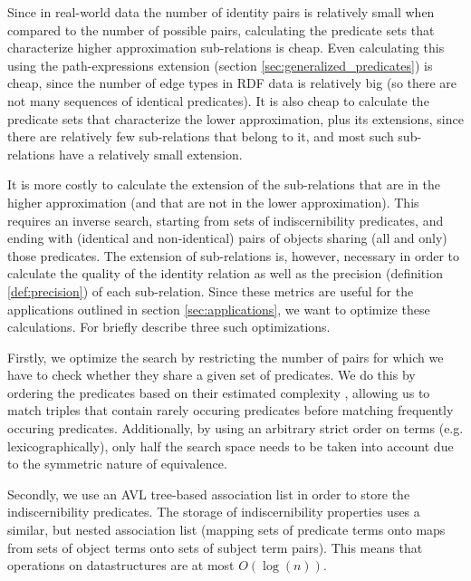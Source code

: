 Since in real-world data the number of identity pairs
  is relatively small when compared to the number of possible pairs,
  calculating the predicate sets that characterize higher approximation
  sub-relations is cheap.
Even calculating this using the path-expressions extension
  (section \ref{sec:generalized_predicates})
  is cheap, since the number of edge types in RDF data is relatively big
  (so there are not many sequences of identical predicates).
It is also cheap to calculate the predicate sets that characterize
  the lower approximation, plus its extensions,
  since there are relatively few sub-relations that belong to it,
  and most such sub-relations have a relatively small extension.

It is more costly to calculate the extension of the sub-relations that are
  in the higher approximation (and that are not in the lower approximation).
This requires an inverse search, starting from sets of
  indiscernibility predicates, and ending with (identical and non-identical)
  pairs of objects sharing (all and only) those predicates.
The extension of sub-relations is, however, necessary in order to
  calculate the quality of the identity relation
  as well as the precision (definition \ref{def:precision})
  of each sub-relation.
Since these metrics are useful for the applications outlined
  in section \ref{sec:applications},
  we want to optimize these calculations.
For briefly describe three such optimizations.

Firstly, we optimize the search by restricting the number of pairs
  for which we have to check whether they share a given set of predicates.
We do this by ordering the predicates based on their
  estimated complexity \cite{Wielemaker2005},
  allowing us to match triples that contain rarely occuring predicates
  before matching frequently occuring predicates.
Additionally, by using an arbitrary strict order on terms
  (e.g. lexicographically),
  only half the search space needs to be taken into account
  due to the symmetric nature of equivalence.

Secondly, we use an AVL tree-based association list
  in order to store the indiscernibility predicates.
The storage of indiscernibility properties uses a similar, but nested
  association list (mapping sets of predicate terms onto
  maps from sets of object terms onto sets of subject term pairs).
This means that operations on datastructures are at most $O(\log(n))$.

